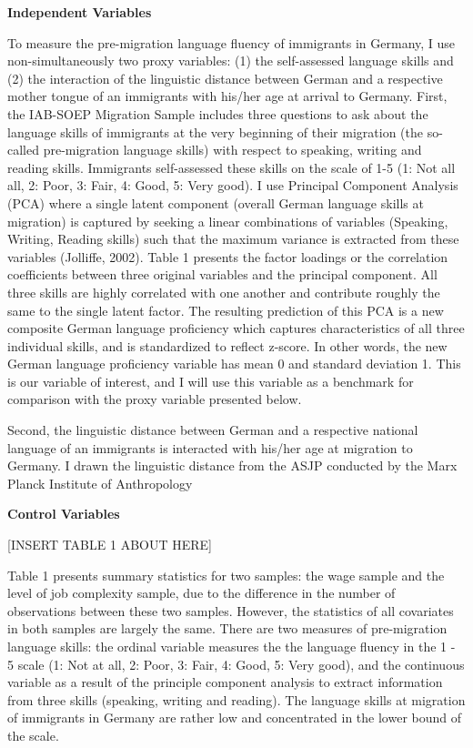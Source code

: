 \documentclass[12pt,a4paper]{article}
\begin{document}
\begin{flushleft}
\textbf{Independent Variables} 
\end{flushleft}

To measure the pre-migration language fluency of immigrants in Germany, I use non-simultaneously two proxy variables: (1) the self-assessed language skills and (2) the interaction of the linguistic distance between German and a respective mother tongue of an immigrants with his/her age at arrival to Germany. First, the IAB-SOEP Migration Sample includes three questions to ask about the language skills of immigrants at the very beginning of their migration (the so-called pre-migration language skills) with respect to speaking, writing and reading skills. Immigrants self-assessed these skills on the scale of 1-5 (1: Not all all, 2: Poor, 3: Fair, 4: Good, 5: Very good). I use Principal Component Analysis (PCA) where a single latent component (overall German language skills at migration) is captured by seeking a linear combinations of variables (Speaking, Writing, Reading skills) such that the maximum variance is extracted from these variables (Jolliffe, 2002). Table 1 presents the factor loadings or the correlation coefficients between three original variables and the principal component. All three skills are highly correlated with one another and contribute roughly the same to the single latent factor. The resulting prediction of this PCA is a new composite German language proficiency which captures characteristics of all three individual skills, and is standardized to reflect z-score. In other words, the new German language proficiency variable has mean 0 and standard deviation 1. This is our variable of interest, and I will use this variable as a benchmark for comparison with the proxy variable presented below.

Second, the linguistic distance between German and a respective national language of an immigrants is interacted with his/her age at migration to Germany. I drawn the linguistic distance from the ASJP conducted by the Marx Planck Institute of Anthropology

\begin{flushleft}
\textbf{Control Variables} 
\end{flushleft}

\begin{center}
[INSERT TABLE 1 ABOUT HERE]
\end{center}

Table 1 presents summary statistics for two samples: the wage sample and the level of job complexity sample, due to the difference in the number of observations between these two samples. However, the statistics of all covariates in both samples are largely the same.  There are two measures of pre-migration language skills: the ordinal variable measures the the language fluency in the 1 - 5 scale (1: Not at all, 2: Poor, 3: Fair, 4: Good, 5: Very good), and the continuous variable as a result of the principle component analysis to extract information from three skills (speaking, writing and reading). The language skills at migration of immigrants in Germany are rather low and concentrated in the lower bound of the scale.
\end{document}

